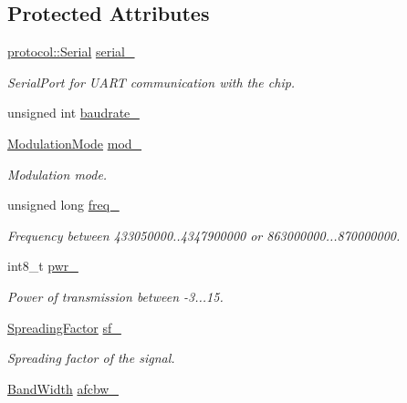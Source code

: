 \subsection*{Protected Attributes}
\begin{DoxyCompactItemize}
\item 
\hyperlink{classo_cpt_1_1protocol_1_1_serial}{protocol\+::\+Serial} \hyperlink{classo_cpt_1_1_lo_ra_ab349fec280811fd5172f91652abe2775}{serial\+\_\+}
\begin{DoxyCompactList}\small\item\em Serial\+Port for U\+A\+RT communication with the chip. \end{DoxyCompactList}\item 
unsigned int \hyperlink{classo_cpt_1_1_lo_ra_a076f477e2096b2a49c8d4c25b79b1143}{baudrate\+\_\+}
\item 
\hyperlink{classo_cpt_1_1_lo_ra_a9791fe69244f3c8af2fd592d2573f939}{Modulation\+Mode} \hyperlink{classo_cpt_1_1_lo_ra_a98e0dc05a9e45a08afa36beddfe27072}{mod\+\_\+}
\begin{DoxyCompactList}\small\item\em Modulation mode. \end{DoxyCompactList}\item 
unsigned long \hyperlink{classo_cpt_1_1_lo_ra_ab57a9c27d2f5744eaf07bdee11a24aba}{freq\+\_\+}
\begin{DoxyCompactList}\small\item\em Frequency between 433050000..4347900000 or 863000000...870000000. \end{DoxyCompactList}\item 
int8\+\_\+t \hyperlink{classo_cpt_1_1_lo_ra_a26a74b857c4fe90af4217f38dc735220}{pwr\+\_\+}
\begin{DoxyCompactList}\small\item\em Power of transmission between -\/3...15. \end{DoxyCompactList}\item 
\hyperlink{classo_cpt_1_1_lo_ra_a8a682cc4db78b2afb14ad5cdb713b1e1}{Spreading\+Factor} \hyperlink{classo_cpt_1_1_lo_ra_acebd51c3b66932357035150f21e88d38}{sf\+\_\+}
\begin{DoxyCompactList}\small\item\em Spreading factor of the signal. \end{DoxyCompactList}\item 
\hyperlink{classo_cpt_1_1_lo_ra_abb27d22a584625eea0339906152c031d}{Band\+Width} \hyperlink{classo_cpt_1_1_lo_ra_a776e20c9dbac73ba02dca35c63ee4807}{afcbw\+\_\+}

\end{DoxyCompactItemize}
